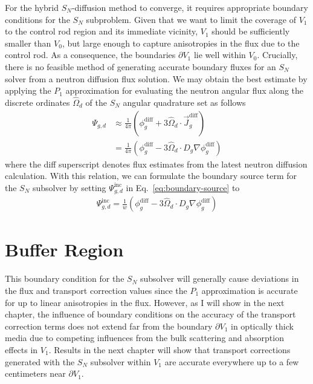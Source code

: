 For the hybrid $S_N$-diffusion method to converge, it requires appropriate boundary conditions for
the $S_N$ subproblem.
Given that we want to limit the coverage of $V_1$ to the control rod region and its
immediate vicinity, $V_1$ should be sufficiently smaller than $V_0$, but large enough to capture
anisotropies in the flux due to the control rod. As a consequence, the boundaries $\partial V_1$ 
lie well within $V_0$. Crucially, there is no feasible method of generating
accurate boundary fluxes for an $S_N$ solver from a neutron diffusion flux solution. We may obtain
the best estimate by applying the $P_1$ approximation for evaluating the neutron angular flux along
the discrete ordinates $\hat{\Omega}_d$ of the $S_N$ angular quadrature set as follows
%
\begin{align}
  \Psi_{g,d} &\approx \frac{1}{4\pi}\left(\phi^\text{diff}_g+3\hat{\Omega}_d\cdot
  \vec{J}^\text{diff}_g\right) \nonumber \\
  &=\frac{1}{4\pi}\left(\phi^\text{diff}_g-3\hat{\Omega}_d\cdot D_g\nabla\phi^\text{diff}_g\right)
\end{align}
%
where the diff superscript denotes flux estimates from the latest neutron diffusion calculation.
With this relation, we can formulate the boundary source term for the $S_N$ subsolver by setting
$\Psi^\text{inc}_{g,d}$ in Eq.\ \ref{eq:boundary-source} to
%
\begin{gather}
  \Psi^\text{inc}_{g,d} = \frac{1}{w}
  \left(\phi^\text{diff}_g-3\hat{\Omega}_d\cdot D_g\nabla\phi^\text{diff}_g\right)
\end{gather}

\section{Buffer Region} \label{sec:buffer-region}

This boundary condition for the $S_N$ subsolver will generally cause deviations
in the flux and transport correction values since the $P_1$ approximation is accurate for up to
linear anisotropies in the flux. However, as I will show in the next chapter, the influence of
boundary conditions on the accuracy of
the transport correction terms does not extend far from the boundary $\partial V_1$ in optically
thick media due to competing influences from the bulk scattering and absorption effects in $V_1$.
Results in the next chapter will show that transport corrections generated with the $S_N$
subsolver within $V_1$ are accurate everywhere up to a few centimeters near $\partial V_1$.

